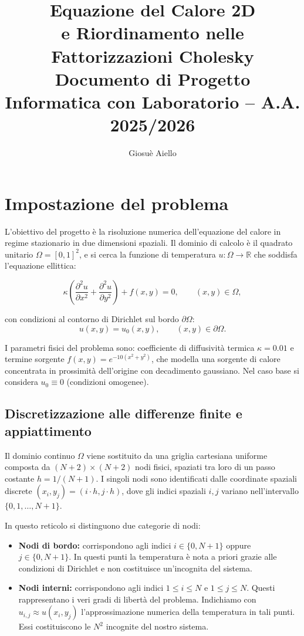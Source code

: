 \documentclass[a4paper,12pt]{article}
\title{%
  \LARGE\textbf{Equazione del Calore 2D}\\[6pt]
  \LARGE\textbf{e Riordinamento nelle Fattorizzazioni Cholesky}\\[12pt]
  \large Documento di Progetto\\[4pt]
  \normalsize Informatica con Laboratorio -- A.A. 2025/2026
}
\author{Giosuè Aiello}
\date{}
\begin{document}
\maketitle
\thispagestyle{empty}

\section{Impostazione del problema}

L'obiettivo del progetto è la risoluzione numerica dell'equazione del calore in regime stazionario in due dimensioni spaziali. Il dominio di calcolo è il quadrato unitario $\Omega = [0,1]^2$, e si cerca la funzione di temperatura $u : \Omega \to \mathbb{R}$ che soddisfa l'equazione ellittica:

\begin{equation}
  \kappa \left(\frac{\partial^2 u}{\partial x^2} + \frac{\partial^2 u}{\partial y^2}\right) + f(x,y) = 0,
  \qquad (x,y) \in \Omega,
  \label{eq:calore}
\end{equation}

con condizioni al contorno di Dirichlet sul bordo $\partial\Omega$:
\[
  u(x,y) = u_0(x,y), \qquad (x,y) \in \partial\Omega.
\]

I parametri fisici del problema sono: coefficiente di diffusività termica $\kappa = 0.01$ e termine sorgente $f(x,y) = e^{-10(x^2+y^2)}$, che modella una sorgente di calore concentrata in prossimità dell'origine con decadimento gaussiano. Nel caso base si considera $u_0 \equiv 0$ (condizioni omogenee).

\subsection*{Discretizzazione alle differenze finite e appiattimento}

Il dominio continuo $\Omega$ viene sostituito da una griglia cartesiana uniforme composta da $(N+2) \times (N+2)$ nodi fisici, spaziati tra loro di un passo costante $h = 1/(N+1)$. I singoli nodi sono identificati dalle coordinate spaziali discrete $(x_i, y_j) = (i \cdot h, j \cdot h)$, dove gli indici spaziali $i, j$ variano nell'intervallo $\{0, 1, \dots, N+1\}$. 

In questo reticolo si distinguono due categorie di nodi:
\begin{itemize}
    \item \textbf{Nodi di bordo:} corrispondono agli indici $i \in \{0, N+1\}$ oppure $j \in \{0, N+1\}$. In questi punti la temperatura è nota a priori grazie alle condizioni di Dirichlet e non costituisce un'incognita del sistema.
    \item \textbf{Nodi interni:} corrispondono agli indici $1 \le i \le N$ e $1 \le j \le N$. Questi rappresentano i veri gradi di libertà del problema. Indichiamo con $u_{i,j} \approx u(x_i, y_j)$ l'approssimazione numerica della temperatura in tali punti. Essi costituiscono le $N^2$ incognite del nostro sistema.
\end{itemize}
\end{document}
